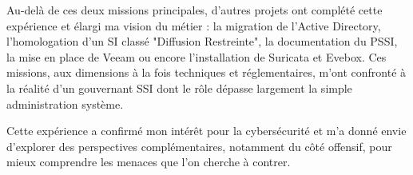 \documentclass[a4paper, 11pt]{article}
\begin{document}
 
Au-delà de ces deux missions principales, d'autres projets ont complété cette expérience et élargi ma vision du métier : la migration de l'Active Directory,
 l'homologation d'un SI classé "Diffusion Restreinte", la documentation du PSSI, la mise en place de Veeam ou encore l'installation de Suricata et Evebox.
  Ces missions, aux dimensions à la fois techniques et réglementaires, m'ont confronté à la réalité d'un gouvernant SSI dont le rôle dépasse largement la 
  simple administration système.
  \par\bigskip
Cette expérience a confirmé mon intérêt pour la cybersécurité et m'a donné envie 
d'explorer des perspectives complémentaires, notamment du côté offensif, pour mieux comprendre les menaces que l'on cherche à contrer.



\newpage
\printglossaries
\printnoidxglossary

\end{document}
